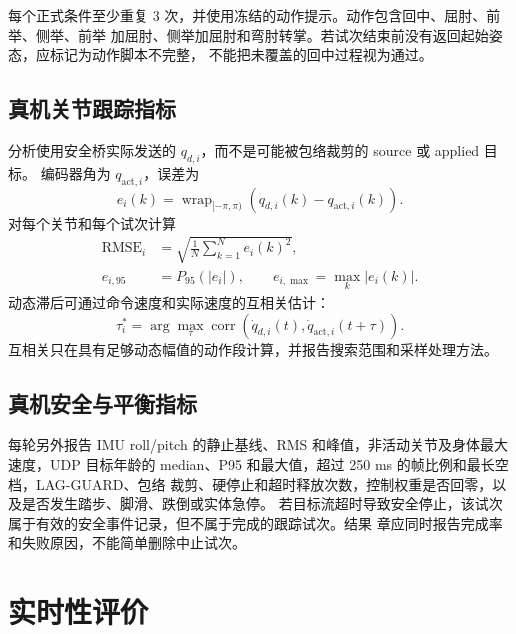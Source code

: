 每个正式条件至少重复 3 次，并使用冻结的动作提示。动作包含回中、屈肘、前举、侧举、前举
加屈肘、侧举加屈肘和弯肘转掌。若试次结束前没有返回起始姿态，应标记为动作脚本不完整，
不能把未覆盖的回中过程视为通过。

\subsection{真机关节跟踪指标}
\label{subsec:ch6_real_tracking_metrics}

分析使用安全桥实际发送的 $q_{d,i}$，而不是可能被包络裁剪的 source 或 applied 目标。
编码器角为 $q_{\mathrm{act},i}$，误差为
\begin{equation}
  e_i(k)=
  \operatorname{wrap}_{[-\pi,\pi)}
  \left(q_{d,i}(k)-q_{\mathrm{act},i}(k)\right).
  \label{eq:ch6_real_joint_error}
\end{equation}
对每个关节和每个试次计算
\begin{align}
  \operatorname{RMSE}_i
  &=\sqrt{\frac{1}{N}\sum_{k=1}^{N}e_i(k)^2},
  \label{eq:ch6_real_joint_rmse}\\
  e_{i,95}&=P_{95}(|e_i|),\qquad
  e_{i,\max}=\max_k |e_i(k)|.
  \label{eq:ch6_real_joint_tail_errors}
\end{align}
动态滞后可通过命令速度和实际速度的互相关估计：
\begin{equation}
  \tau_i^\ast=
  \arg\max_{\tau}
  \operatorname{corr}\left(
  \dot q_{d,i}(t),\dot q_{\mathrm{act},i}(t+\tau)\right).
  \label{eq:ch6_tracking_delay}
\end{equation}
互相关只在具有足够动态幅值的动作段计算，并报告搜索范围和采样处理方法。

\subsection{真机安全与平衡指标}
\label{subsec:ch6_real_safety_metrics}

每轮另外报告 IMU roll/pitch 的静止基线、RMS 和峰值，非活动关节及身体最大速度，UDP
目标年龄的 median、P95 和最大值，超过 250 ms 的帧比例和最长空档，LAG-GUARD、包络
裁剪、硬停止和超时释放次数，控制权重是否回零，以及是否发生踏步、脚滑、跌倒或实体急停。
若目标流超时导致安全停止，该试次属于有效的安全事件记录，但不属于完成的跟踪试次。结果
章应同时报告完成率和失败原因，不能简单删除中止试次。

\section{实时性评价}
\label{sec:ch6_realtime_evaluation}

